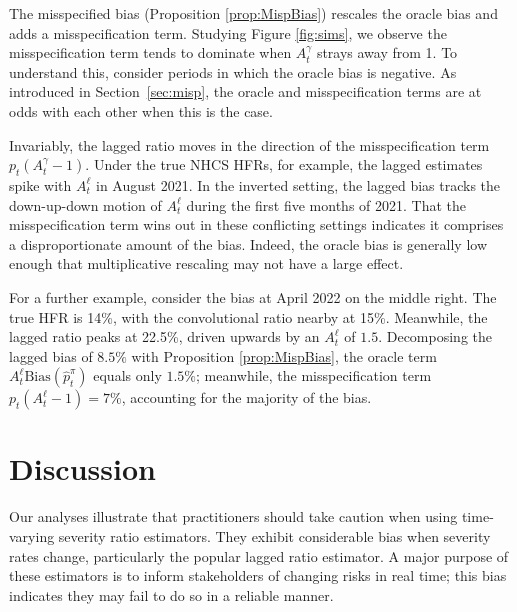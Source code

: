 \documentclass{article}
\renewcommand{\hat}{\widehat} %
\begin{document}
The misspecified bias (Proposition \ref{prop:MispBias}) rescales the oracle bias and adds a misspecification term. Studying Figure \ref{fig:sims}, we observe the misspecification term tends to dominate when $A_t^\gamma$ strays away from 1. To understand this, consider periods in which the oracle bias is negative. As introduced in Section~\ref{sec:misp}, the oracle and misspecification terms are at odds with each other when this is the case. 

Invariably, the lagged ratio moves in the direction of the misspecification term $p_t(A_t^\gamma-1)$. Under the true NHCS HFRs, for example, the lagged estimates spike with $A_t^\ell$ in August 2021. In the inverted setting, the lagged bias tracks the down-up-down motion of $A_t^\ell$ during the first five months of 2021. That the misspecification term wins out in these conflicting settings indicates it comprises a disproportionate amount of the bias. Indeed, the oracle bias is generally low enough that multiplicative rescaling may not have a large effect.

For a further example, consider the bias at April 2022 on the middle right. The true HFR is 14\%, with the convolutional ratio nearby at 15\%. Meanwhile, the lagged ratio peaks at 22.5\%, driven upwards by an $A_t^\ell$ of $1.5$. Decomposing the lagged bias of $8.5\%$ with Proposition \ref{prop:MispBias}, the oracle term $A_t^\ell \text{Bias}(\hat{p}_t^\pi)$ equals only $1.5\%$; meanwhile, the misspecification term $p_t(A_t^\ell-1) = 7\%$, accounting for the majority of the bias. 

\section{Discussion}

Our analyses illustrate that practitioners should take caution when using
time-varying severity ratio estimators. They exhibit considerable bias when severity rates
change, particularly the popular lagged ratio estimator. A major purpose of these
estimators is to inform stakeholders of changing risks in real time; this bias
indicates they may fail to do so in a reliable manner.
\end{document}
